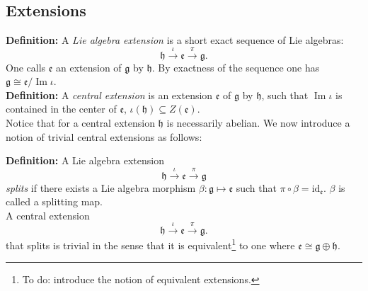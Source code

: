 \documentclass[submission, PhysLectNotes]{SciPost}
\DeclareMathOperator{\Ima}{Im}
\begin{document}
\subsection{Extensions}
{\bf Definition:} A \emph{Lie algebra extension} is a short exact sequence of Lie algebras:
\begin{equation}
	\mathfrak{h}\overset{\iota}{\rightarrow}\mathfrak{e}\overset{\pi}{\rightarrow}\mathfrak{g}.
\end{equation}
One calls $\mathfrak{e}$ an extension of $\mathfrak{g}$ by $\mathfrak{h}$. By exactness of the sequence one has $\mathfrak{g}\cong\mathfrak{e}\slash\Ima\iota$.\\

{\bf Definition:} A \emph{central extension} is an extension $\mathfrak{e}$ of $\mathfrak{g}$ by $\mathfrak{h}$, such that $\Ima \iota$ is contained in the center of $\mathfrak{e}$, $\iota(\mathfrak{h})\subseteq Z(\mathfrak{e})$.\\

Notice that for a central extension $\mathfrak{h}$ is necessarily abelian. We now introduce a notion of trivial central extensions as follows:

{\bf Definition:} A Lie algebra extension
\begin{equation}
	\mathfrak{h}\overset{\iota}{\rightarrow}\mathfrak{e}\overset{\pi}{\rightarrow}\mathfrak{g}
\end{equation}
\emph{splits} if there exists a Lie algebra morphism $\beta: \mathfrak{g}\mapsto\mathfrak{e}$ such that $\pi\circ\beta = \text{id}_{\mathfrak{e}}$. $\beta$ is called a splitting map.\\

A central extension
\begin{equation}
	\mathfrak{h}\overset{\iota}{\rightarrow}\mathfrak{e}\overset{\pi}{\rightarrow}\mathfrak{g}.
\end{equation}
that splits is trivial in the sense that it is equivalent\footnote{To do: introduce the notion of equivalent extensions.} to one where $\mathfrak{e}\cong\mathfrak{g}\oplus\mathfrak{h}$.\\
\end{document}
